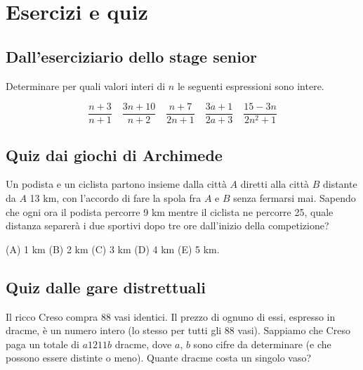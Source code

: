 \chapter{Esercizi e quiz}
\label{ch:quiz}

\section{Dall'eserciziario dello stage senior}
\label{sec:quiz_stage_senior}

\begin{esercizio}
    \label{ex:stage_senior_41}
    Determinare per quali valori interi di $n$ le seguenti espressioni sono intere.

    \begin{equation*}
        \dfrac{n + 3}{n + 1} \quad \dfrac{3n + 10}{n + 2} \quad \dfrac{n + 7}{2n + 1} \quad \dfrac{3a + 1}{2a + 3} \quad
        \dfrac{15 - 3n}{2n^2 + 1}
    \end{equation*}
\end{esercizio}

\section{Quiz dai giochi di Archimede}
\label{sec:quiz_giochi_archimede}

\begin{esercizio}
    \label{ex:archimede_2000_triennio_1}
    Un podista e un ciclista partono insieme dalla città $A$ diretti alla città $B$ distante da $A$ 13 km, con
    l’accordo di fare la spola fra $A$ e $B$ senza fermarsi mai.
    Sapendo che ogni ora il podista percorre 9 km mentre il ciclista ne percorre 25, quale distanza separerà i due
    sportivi dopo tre ore dall’inizio della competizione?

    (A) 1 km \quad (B) 2 km \quad (C) 3 km \quad (D) 4 km \quad (E) 5 km.
\end{esercizio}

\section{Quiz dalle gare distrettuali}
\label{sec:quiz_gare_distrettuali}

\begin{esercizio}
    \label{ex:distrettuali_2017_13}
    Il ricco Creso compra 88 vasi identici.
    Il prezzo di ognuno di essi, espresso in dracme, è un numero intero (lo stesso per tutti gli 88 vasi).
    Sappiamo che Creso paga un totale di $a1211b$ dracme, dove $a$, $b$ sono cifre da determinare
    (e che possono essere distinte o meno).
    Quante dracme costa un singolo vaso?
\end{esercizio}

